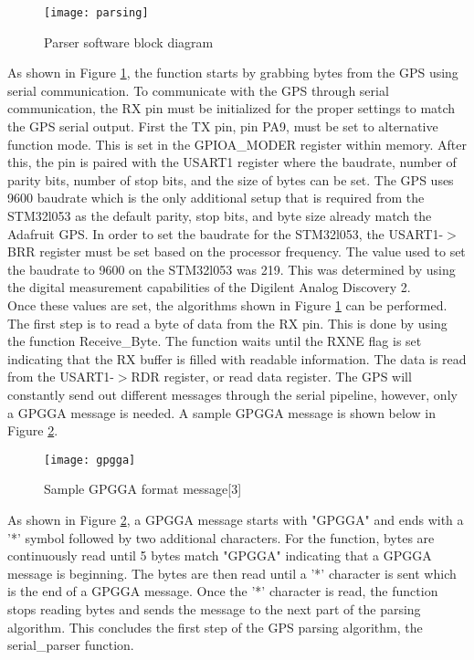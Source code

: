 \documentclass[12pt, letterpaper]{article}
\begin{document}
\begin{figure}[H]
    \centering
    \texttt{[image: parsing]}
    \caption{Parser software block diagram}
    \label{Ass3}
\end{figure}

As shown in Figure \ref{Ass3}, the function starts by grabbing bytes from the GPS using serial communication. To communicate with the GPS through serial communication, the RX pin must be initialized for the proper settings to match the GPS serial output. First the TX pin, pin PA9, must be set to alternative function mode. This is set in the GPIOA\_MODER register within memory. After this, the pin is paired with the USART1 register where the baudrate, number of parity bits, number of stop bits, and the size of bytes can be set. The GPS uses 9600 baudrate which is the only additional setup that is required from the STM32l053 as the default parity, stop bits, and byte size already match the Adafruit GPS. In order to set the baudrate for the STM32l053, the USART1-$>$BRR register must be set based on the processor frequency. The value used to set the baudrate to 9600 on the STM32l053 was 219. This was determined by using the digital measurement capabilities of the Digilent Analog Discovery 2. \\

Once these values are set, the algorithms shown in Figure \ref{Ass3} can be performed. The first step is to read a byte of data from the RX pin. This is done by using the function Receive\_Byte. The function waits until the RXNE flag is set indicating that the RX buffer is filled with readable information. The data is read from the USART1-$>$RDR register, or read data register. The GPS will constantly send out different messages through the serial pipeline, however, only a GPGGA message is needed. A sample GPGGA message is shown below in Figure \ref{ASSASSASS}.

\begin{figure}[H]
    \centering
    \texttt{[image: gpgga]}
    \caption{Sample GPGGA format message[3]}
    \label{ASSASSASS}
\end{figure}

As shown in Figure \ref{ASSASSASS}, a GPGGA message starts with "GPGGA" and ends with a '*' symbol followed by two additional characters. For the function, bytes are continuously read until 5 bytes match "GPGGA" indicating that a GPGGA message is beginning. The bytes are then read until a '*' character is sent which is the end of a GPGGA message. Once the '*' character is read, the function stops reading bytes and sends the message to the next part of the parsing algorithm. This concludes the first step of the GPS parsing algorithm, the serial\_parser function. \\
\end{document}
